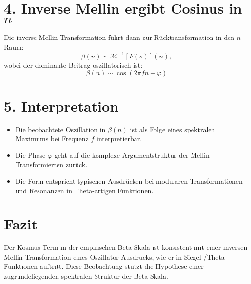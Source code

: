 \documentclass[a4paper,12pt]{article}
\begin{document}
\section*{4. Inverse Mellin ergibt Cosinus in $n$}

Die inverse Mellin-Transformation führt dann zur Rücktransformation in den $n$-Raum:
\[
\beta(n) \sim \mathcal{M}^{-1}[F(s)](n),
\]
wobei der dominante Beitrag oszillatorisch ist:
\[
\boxed{
\beta(n) \sim \cos(2\pi f n + \varphi)
}
\]

\section*{5. Interpretation}

\begin{itemize}
  \item Die beobachtete Oszillation in $\beta(n)$ ist als Folge eines spektralen Maximums bei Frequenz $f$ interpretierbar.
  \item Die Phase $\varphi$ geht auf die komplexe Argumentstruktur der Mellin-Transformierten zurück.
  \item Die Form entspricht typischen Ausdrücken bei modularen Transformationen und Resonanzen in Theta-artigen Funktionen.
\end{itemize}

\section*{Fazit}

Der Kosinus-Term in der empirischen Beta-Skala ist konsistent mit einer inversen Mellin-Transformation eines Oszillator-Ausdrucks, wie er in Siegel-/Theta-Funktionen auftritt. Diese Beobachtung stützt die Hypothese einer zugrundeliegenden spektralen Struktur der Beta-Skala.
\end{document}
